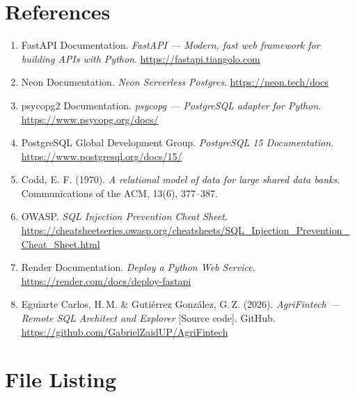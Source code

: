 \documentclass[12pt, a4paper]{article}
\begin{document}
\section{References}

\begin{enumerate}[leftmargin=1.5em]
  \item FastAPI Documentation. \textit{FastAPI — Modern, fast web framework for
        building APIs with Python}. \url{https://fastapi.tiangolo.com}

  \item Neon Documentation. \textit{Neon Serverless Postgres}. \url{https://neon.tech/docs}

  \item psycopg2 Documentation. \textit{psycopg — PostgreSQL adapter for Python}.
        \url{https://www.psycopg.org/docs/}

  \item PostgreSQL Global Development Group. \textit{PostgreSQL 15 Documentation}.
        \url{https://www.postgresql.org/docs/15/}

  \item Codd, E. F. (1970). \textit{A relational model of data for large shared data
        banks}. Communications of the ACM, 13(6), 377–387.

  \item OWASP. \textit{SQL Injection Prevention Cheat Sheet}.
        \url{https://cheatsheetseries.owasp.org/cheatsheets/SQL_Injection_Prevention_Cheat_Sheet.html}

  \item Render Documentation. \textit{Deploy a Python Web Service}.
        \url{https://render.com/docs/deploy-fastapi}

  \item Eguiarte Carlos, H.\,M. \& Gutiérrez González, G.\,Z. (2026).
        \textit{AgriFintech — Remote SQL Architect and Explorer} [Source code].
        GitHub. \url{https://github.com/GabrielZaidUP/AgriFintech}
\end{enumerate}

\appendix

\section{File Listing}
\end{document}
